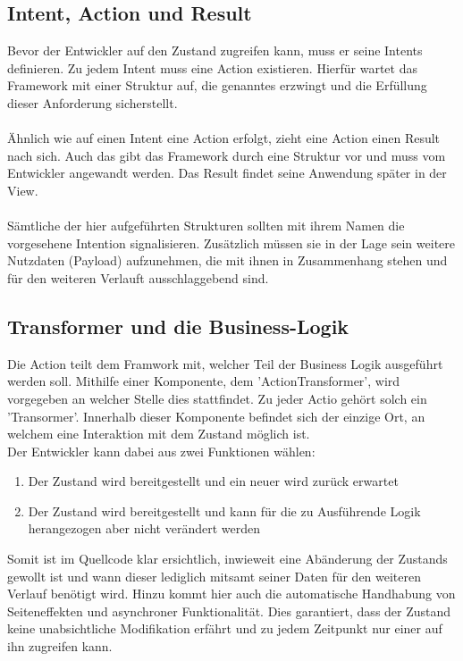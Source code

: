 \subsection{Intent, Action und Result}
Bevor der Entwickler auf den Zustand zugreifen kann, muss er seine Intents definieren. Zu jedem Intent muss eine Action existieren. Hierfür wartet das Framework mit einer Struktur auf, die genanntes erzwingt und die Erfüllung dieser Anforderung sicherstellt. 
\\
\\
Ähnlich wie auf einen Intent eine Action erfolgt, zieht eine Action einen Result nach sich. Auch das gibt das Framework durch eine Struktur vor und muss vom Entwickler angewandt werden. Das Result findet seine Anwendung später in der View.
\\
\\
Sämtliche der hier aufgeführten Strukturen sollten mit ihrem Namen die vorgesehene Intention signalisieren. Zusätzlich müssen sie in der Lage sein weitere Nutzdaten (Payload) aufzunehmen, die mit ihnen in Zusammenhang stehen und für den weiteren Verlauft ausschlaggebend sind.

\subsection{Transformer und die Business-Logik}
Die Action teilt dem Framwork mit, welcher Teil der Business Logik ausgeführt werden soll. Mithilfe einer Komponente, dem 'ActionTransformer', wird vorgegeben an welcher Stelle dies stattfindet. Zu jeder Actio gehört solch ein 'Transormer'. Innerhalb dieser Komponente befindet sich der einzige Ort, an welchem eine Interaktion mit dem Zustand möglich ist.
\\
Der Entwickler kann dabei aus zwei Funktionen wählen:
\begin{enumerate}
	\item Der Zustand wird bereitgestellt und ein neuer wird zurück erwartet
	\item Der Zustand wird bereitgestellt und kann für die zu Ausführende Logik herangezogen aber nicht verändert werden 
\end{enumerate}
\bigskip
Somit ist im Quellcode klar ersichtlich, inwieweit eine Abänderung der Zustands gewollt ist und wann dieser lediglich mitsamt seiner Daten für den weiteren Verlauf benötigt wird. Hinzu kommt hier auch die automatische Handhabung von Seiteneffekten und asynchroner Funktionalität. Dies garantiert, dass der Zustand keine unabsichtliche Modifikation erfährt und zu jedem Zeitpunkt nur einer auf ihn zugreifen kann.

